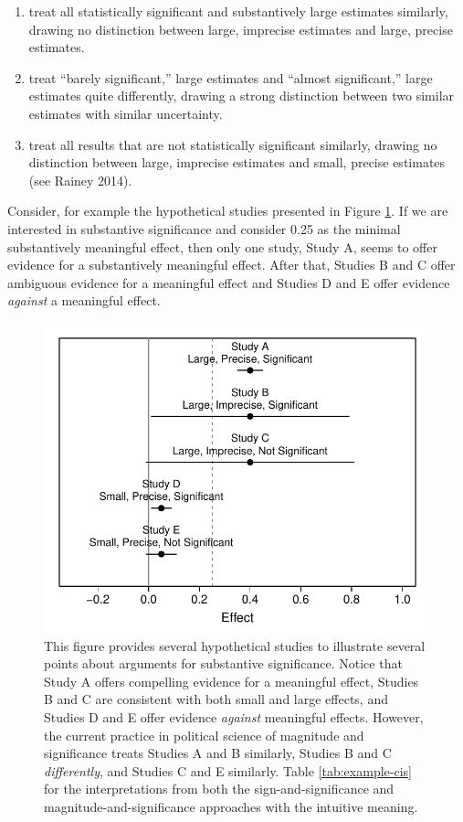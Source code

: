 \documentclass[12pt]{article}
\begin{document}
\begin{enumerate}
\item treat all statistically significant and substantively large estimates similarly, drawing no distinction between large, imprecise estimates and large, precise estimates.
\item treat ``barely significant,'' large estimates and ``almost significant,'' large estimates quite differently, drawing a strong distinction between two similar estimates with similar uncertainty.
\item treat all results that are not statistically significant similarly, drawing no distinction between large, imprecise estimates and small, precise estimates (see Rainey 2014).
\end{enumerate}

Consider, for example the hypothetical studies presented in Figure \ref{fig:example-cis}. If we are interested in substantive significance and consider 0.25 as the minimal substantively meaningful effect, then only one study, Study A, seems to offer evidence for a substantively meaningful effect. After that, Studies B and C offer ambiguous evidence for a meaningful effect and Studies D and E offer evidence \emph{against} a meaningful effect.

\begin{figure}[H]
\begin{center}
\includegraphics[scale = .8]{figs/example-cis.pdf}
\caption{This figure provides several hypothetical studies to illustrate several points about arguments for substantive significance. Notice that Study A offers compelling evidence for a meaningful effect, Studies B and C are consistent with both small and large effects, and Studies D and E offer evidence \emph{against} meaningful effects. However, the current practice in political science of magnitude and significance treats Studies A and B similarly, Studies B and C \emph{differently}, and Studies C and E similarly. Table \ref{tab:example-cis} for the interpretations from both the sign-and-significance and magnitude-and-significance approaches with the intuitive meaning.}\label{fig:example-cis}
\end{center}
\end{figure}
\end{document}
